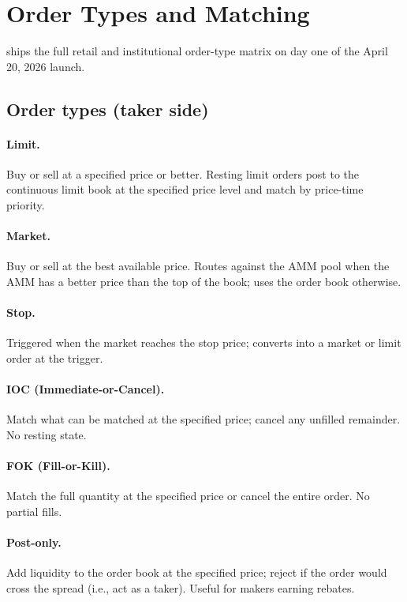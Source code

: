 \section{Order Types and Matching}
\label{sec:order-types}

\Zoo{} \DEX{} ships the full retail and institutional order-type
matrix on day one of the April 20, 2026 launch.

\subsection{Order types (taker side)}

\paragraph{Limit.}
Buy or sell at a specified price or better. Resting limit orders
post to the continuous limit book at the specified price level and
match by price-time priority.

\paragraph{Market.}
Buy or sell at the best available price. Routes against the AMM
pool when the AMM has a better price than the top of the book; uses
the order book otherwise.

\paragraph{Stop.}
Triggered when the market reaches the stop price; converts into a
market or limit order at the trigger.

\paragraph{IOC (Immediate-or-Cancel).}
Match what can be matched at the specified price; cancel any
unfilled remainder. No resting state.

\paragraph{FOK (Fill-or-Kill).}
Match the full quantity at the specified price or cancel the entire
order. No partial fills.

\paragraph{Post-only.}
Add liquidity to the order book at the specified price; reject if
the order would cross the spread (i.e., act as a taker). Useful for
makers earning rebates.

